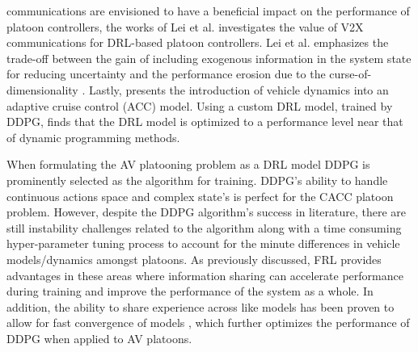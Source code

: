 communications are envisioned to have a beneficial impact on the performance of platoon
controllers, the works of Lei et al. investigates the value of V2X communications for
DRL-based platoon controllers. Lei et al. emphasizes the trade-off between the gain of
including exogenous information in the system state for reducing uncertainty and the
performance erosion due to the curse-of-dimensionality \cite{LeiV2x}. Lastly, \cite{Yuan2019}
presents the introduction of vehicle dynamics into an adaptive cruise control (ACC) model.
Using a custom DRL model, trained by DDPG, \cite{Yuan2019} finds that the DRL model is optimized
to a performance level near that of dynamic programming methods.

When formulating the AV platooning problem as a DRL model DDPG is prominently selected
as the algorithm for training.  DDPG's ability to handle continuous actions space and
complex state's is perfect for the CACC platoon problem.  However, despite the DDPG
algorithm's success in literature, there are still instability challenges related to
the algorithm along with a time consuming hyper-parameter tuning process to account
for the minute differences in vehicle models/dynamics amongst platoons. As previously
discussed, FRL provides advantages in these areas where information sharing can accelerate
performance during training and improve the performance of the system as a whole. In
addition, the ability to share experience across like models has been proven to allow
for fast convergence of models \cite{Lim2020}, which further optimizes the performance
of DDPG when applied to AV platoons.